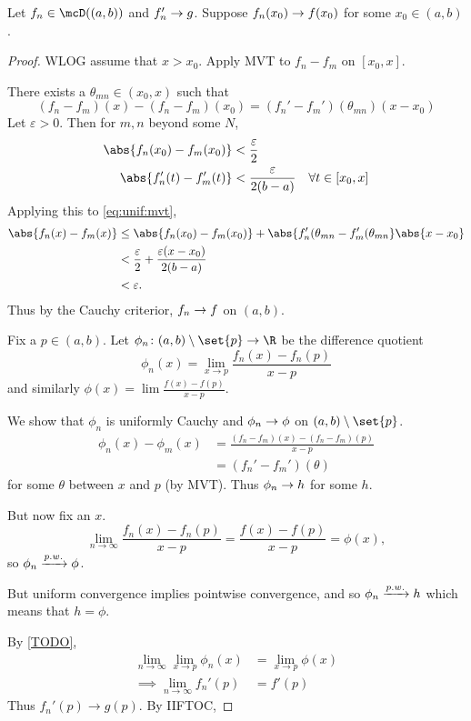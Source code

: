 \begin{theorem}
    Let $f_n \in \mcD((a, b))$ and $f_n' \rightarrow g$.
    Suppose $f_n(x_0) \rightarrow f(x_0)$ for some $x_0 \in (a, b)$.
\end{theorem}
\begin{proof}
    WLOG assume that $x > x_0$.
    Apply MVT to $f_n - f_m$ on $[x_0, x]$.

    There exists a $\theta_{m n} \in (x_0, x)$ such that \begin{equation}
        (f_n - f_m)(x) - (f_n - f_m)(x_0)
            = (f_n' - f_m')(\theta_{m n}) (x - x_0)
            \label{eq:unif:mvt}
    \end{equation} Let $\varepsilon > 0$.
    Then for $m, n$ beyond some $N$, \begin{align*}
        \abs{f_n(x_0) - f_m(x_0)} &< \frac{\varepsilon}{2} \\
        \abs{f_n'(t) - f_m'(t)} &< \frac{\varepsilon}{2(b-a)}
                                \quad \forall t \in [x_0, x]
    \end{align*}
    Applying this to \cref{eq:unif:mvt}, \begin{align*}
        \abs{f_n(x) - f_m(x)}
        &\le \abs{f_n(x_0) - f_m(x_0)}
            + \abs{f_n'(\theta_{m n} - f_m'(\theta_{m n}} \abs{x - x_0} \\
        &< \frac{\varepsilon}{2} + \frac{\varepsilon(x-x_0)}{2(b-a)} \\
        &< \varepsilon.
    \end{align*}
    Thus by the Cauchy criterior, $f_n \rightarrow f$ on $(a, b)$.

    Fix a $p \in (a, b)$.
    Let $\phi_n\colon (a, b) \setminus \set{p} \to \R$ be the difference
    quotient \[
        \phi_n(x) = \lim_{x \to p} \frac{f_n(x) - f_n(p)}{x - p}
    \] and similarly $\phi(x) = \lim \frac{f(x) - f(p)}{x - p}$.

    We show that $\phi_n$ is uniformly Cauchy and $\phi_n \rightarrow \phi$
    on $(a, b) \setminus \set{p}$.
    \begin{align*}
        \phi_n(x) - \phi_m(x)
        &= \frac{(f_n - f_m)(x) - (f_n - f_m)(p)}{x - p} \\
        &= (f_n' - f_m')(\theta)
    \end{align*} for some $\theta$ between $x$ and $p$ (by MVT).
    Thus $\phi_n \rightarrow h$ for some $h$.

    But now fix an $x$. \[
        \lim_{n \to \infty} \frac{f_n(x) - f_n(p)}{x - p}
            = \frac{f(x) - f(p)}{x - p} = \phi(x),
    \] so $\phi_n \xrightarrow{p.w.} \phi$.

    But uniform convergence implies pointwise convergence, and so
    $\phi_n \xrightarrow{p.w.} h$ which means that $h = \phi$.

    By \cref{TODO}, \begin{align*}
        \lim_{n \to \infty} \lim_{x \to p} \phi_n(x)
        &= \lim_{x \to p} \phi(x) \\
        \implies \lim_{n \to \infty} f_n'(p) &= f'(p)
    \end{align*}
    Thus $f_n'(p) \to g(p)$.
    By IIFTOC, %
\end{proof}

